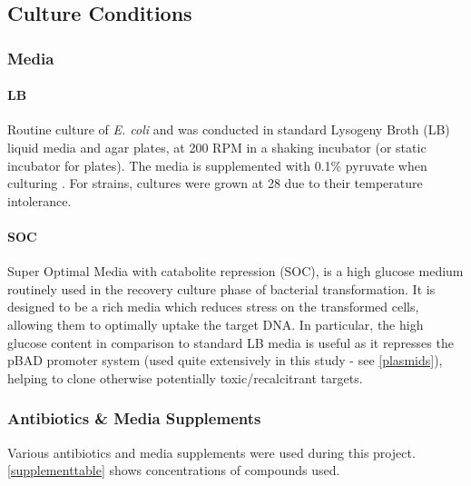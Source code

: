 \subsection{Culture Conditions}
	\subsubsection{Media}
		\paragraph{LB}
		Routine culture of \emph{E. coli} and \Pa{} was conducted in standard Lysogeny Broth (LB) liquid media and agar plates, at 200 RPM in a shaking incubator (or static incubator for plates). The media is supplemented with 0.1\% pyruvate when culturing \Pa. For \Plum{} strains, cultures were grown at 28\degC{} due to their temperature intolerance.
		\paragraph{SOC}
		Super Optimal Media with catabolite repression (SOC), is a high glucose medium routinely used in the recovery culture phase of bacterial transformation. It is designed to be a rich media which reduces stress on the transformed cells, allowing them to optimally uptake the target DNA. In particular, the high glucose content in comparison to standard LB media is useful as it represses the pBAD promoter system (used quite extensively in this study - see \vref{plasmids}), helping to clone otherwise potentially toxic/recalcitrant targets.

	\subsubsection{Antibiotics \& Media Supplements}\label{Antibiotics}
	Various antibiotics and media supplements were used during this project. \vref{supplementtable} shows concentrations of compounds used.
	
